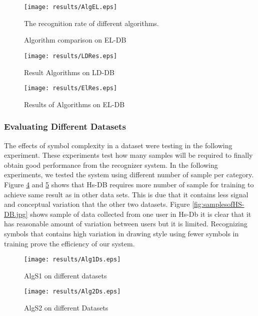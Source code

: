 \begin{figure}
	\centering		
	 \texttt{[image: results/AlgEL.eps]}
	 	\caption{Algorithm comparison on EL-DB} The recognition rate of different algorithms. 
	 	\label{fig:testEL}
\end{figure} 

 
 
 
 
\begin{figure}
	\centering
		\texttt{[image: results/LDRes.eps]}
	\caption{Result Algorithms on LD-DB}
	\label{fig:LDRes}
	
	
\end{figure}
\begin{figure}
	\centering
		\texttt{[image: results/ElRes.eps]}
	\caption{Results of Algorithms on EL-DB}
	\label{fig:ElRes}
\end{figure}


 

\subsubsection {Evaluating Different Datasets}
 \label{sec:EffectsofSymbolComplixity}
 
 The effects of symbol complexity in a dataset were testing in the following experiment. These experiments test how many samples will be required to finally obtain good performance from the recognizer system. In the following experiments, we tested the system using different number of sample per category. 
 Figure \ref{fig:Alg1Ds} and \ref{fig:Alg2Ds} shows that Hs-DB requires more number of sample for training to achieve same result as in other data sets. This is due that it contains less signal and conceptual variation that the other two datasets. Figure \ref{fig:samplesofHS-DB.jpg} shows sample of data collected from one user in Hs-Db it is clear that it has reasonable amount of variation between users but it is limited. Recognizing symbols that contains high variation in drawing style using fewer symbols in training prove the efficiency of our system.
 \begin{figure}
	\centering
		\texttt{[image: results/Alg1Ds.eps]}
	\caption{AlgS1 on different datasets}
	\label{fig:Alg1Ds}
\end{figure}
\begin{figure}
	\centering
		\texttt{[image: results/Alg2Ds.eps]}
	\caption{AlgS2 on different Datasets }
	\label{fig:Alg2Ds}
\end{figure}
 
